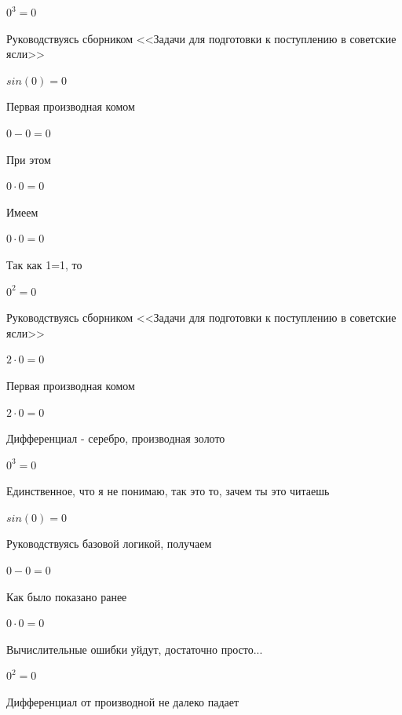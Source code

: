 \documentclass[12pt,a4paper,fleqn]{article}
\begin{document}
\begin{center}$0^{3} = 0$\end{center}
Руководствуясь сборником <<Задачи для подготовки к поступлению в советские ясли>>\cite{link1}

\begin{center}$sin(0) = 0$\end{center}
Первая производная комом\cite{link2}

\begin{center}$0-0 = 0$\end{center}
При этом

\begin{center}$0 \cdot 0 = 0$\end{center}
Имеем

\begin{center}$0 \cdot 0 = 0$\end{center}
Так как 1=1, то\cite{link4}

\begin{center}$0^{2} = 0$\end{center}
Руководствуясь сборником <<Задачи для подготовки к поступлению в советские ясли>>\cite{link1}

\begin{center}$2 \cdot 0 = 0$\end{center}
Первая производная комом\cite{link2}

\begin{center}$2 \cdot 0 = 0$\end{center}
Дифференциал - серебро, производная золото\cite{link2}

\begin{center}$0^{3} = 0$\end{center}
Единственное, что я не понимаю, так это то, зачем ты это читаешь

\begin{center}$sin(0) = 0$\end{center}
Руководствуясь базовой логикой, получаем

\begin{center}$0-0 = 0$\end{center}
Как было показано ранее

\begin{center}$0 \cdot 0 = 0$\end{center}
Вычислительные ошибки уйдут, достаточно просто...

\begin{center}$0^{2} = 0$\end{center}
Дифференциал от производной не далеко падает\cite{link2}
\end{document}
